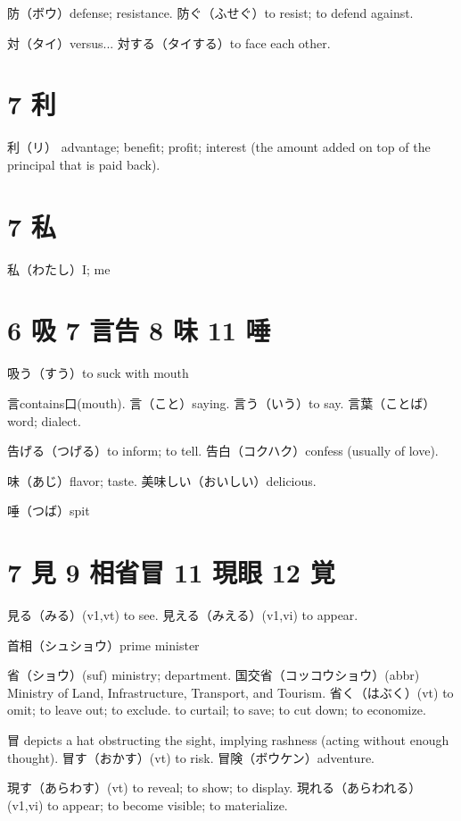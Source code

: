 防（ボウ）defense; resistance.
防ぐ（ふせぐ）to resist; to defend against.

対（タイ）versus...
対する（タイする）to face each other.

\section{7 利}

利（リ）
advantage; benefit; profit;
interest (the amount added on top of the principal that is paid back).

\section{7 私}

私（わたし）I; me

\section{6 吸 7 言告 8 味 11 唾}

吸う（すう）to suck with mouth

言contains口(mouth).
言（こと）saying.
言う（いう）to say.
言葉（ことば）word; dialect.

告げる（つげる）to inform; to tell.
告白（コクハク）confess (usually of love).

味（あじ）flavor; taste.
美味しい（おいしい）delicious.

唾（つば）spit

\section{7 見 9 相省冒 11 現眼 12 覚}

見る（みる）(v1,vt) to see.
見える（みえる）(v1,vi) to appear.

首相（シュショウ）prime minister

省（ショウ）(suf) ministry; department.
国交省（コッコウショウ）(abbr)
Ministry of Land, Infrastructure, Transport, and Tourism.
省く（はぶく）(vt)
to omit; to leave out; to exclude.
to curtail; to save; to cut down; to economize.

冒 depicts a hat obstructing the sight, implying rashness
(acting without enough thought).
冒す（おかす）(vt) to risk.
冒険（ボウケン）adventure.

現す（あらわす）(vt) to reveal; to show; to display.
現れる（あらわれる）(v1,vi) to appear; to become visible; to materialize.

